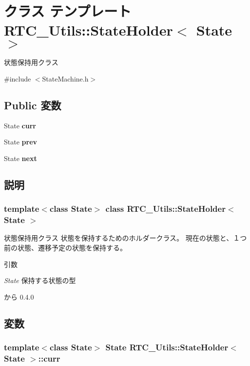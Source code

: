 \section{クラス テンプレート RTC\_\-Utils::StateHolder$<$ State $>$}
\label{structRTC__Utils_1_1StateHolder}


状態保持用クラス  




{\ttfamily \#include $<$StateMachine.h$>$}

\subsection*{Public 変数}
\begin{DoxyCompactItemize}
\item 
State {\bf curr}
\item 
State {\bf prev}
\item 
State {\bf next}
\end{DoxyCompactItemize}


\subsection{説明}
\subsubsection*{template$<$class State$>$ class RTC\_\-Utils::StateHolder$<$ State $>$}

状態保持用クラス 状態を保持するためのホルダークラス。 現在の状態と、１つ前の状態、遷移予定の状態を保持する。


\begin{DoxyParams}{引数}
\item[{\em State}]保持する状態の型\end{DoxyParams}
\begin{DoxySince}{から}
0.4.0 
\end{DoxySince}


\subsection{変数}
\subsubsection[{curr}]{\setlength{\rightskip}{0pt plus 5cm}template$<$class State$>$ State {\bf RTC\_\-Utils::StateHolder}$<$ State $>$::{\bf curr}}\label{structRTC__Utils_1_1StateHolder_a6d8c823054382ec53cf68d84b57e8376}



